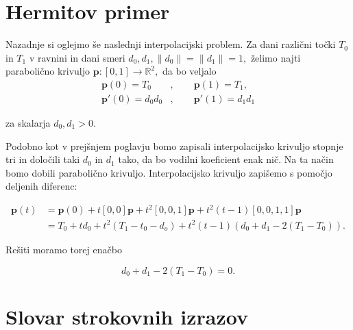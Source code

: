 \documentclass[mat1]{fmfdelo}
\newcommand{\R}{\mathbb R}
\begin{document}

\section{Hermitov primer}

Nazadnje si oglejmo še naslednji interpolacijski problem. Za dani različni točki $T_0$ in $T_1$ v ravnini in dani smeri $d_0, d_1, \lVert d_0 \rVert = \lVert d_1 \rVert = 1,$ želimo najti parabolično krivuljo $\textbf{p} : [ 0, 1 ] \rightarrow \R^2,$ da bo veljalo
\begin{align*}
\textbf{p}(0) = T_0&, \qquad \textbf{p}(1) = T_1, \\
\textbf{p}'(0) = d_0 d_0&, \qquad \textbf{p}'(1) = d_1 d_1 
\end{align*}

za skalarja $d_0, d_1 > 0$.

Podobno kot v prejšnjem poglavju bomo zapisali interpolacijsko krivuljo stopnje tri in določili taki $d_0$ in $d_1$ tako, da bo vodilni koeficient enak nič. Na ta način bomo dobili parabolično krivuljo. Interpolacijsko krivuljo zapišemo s pomočjo deljenih diferenc:

\begin{align*}
\textbf{p}(t) &= \textbf{p}(0) + t [0,0]\textbf{p} + t^2[0,0,1]\textbf{p} + t^2(t - 1)[0,0,1,1]\textbf{p} \\
	&= T_0 + t d_0 + t^2(T_1 - t_0 - d_o) + t^2(t - 1)(d_0 + d_1 - 2(T_1 - T_0))
.\end{align*}

Rešiti moramo torej enačbo

\begin{equation}
d_0 + d_1 - 2(T_1 - T_0) = 0
.\end{equation}


\section*{Slovar strokovnih izrazov}

\geslo{}{}
\geslo{}{}


\begin{thebibliography}{99}


\end{thebibliography}
\end{document}
